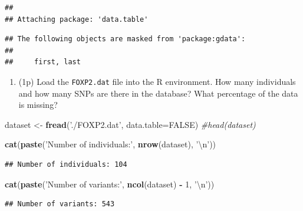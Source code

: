 \documentclass[
]{article}
\newenvironment{Shaded}{\begin{snugshade}}{\end{snugshade}}
\newcommand{\CharTok}[1]{\textcolor[rgb]{0.31,0.60,0.02}{#1}}
\newcommand{\CommentTok}[1]{\textcolor[rgb]{0.56,0.35,0.01}{\textit{#1}}}
\newcommand{\DataTypeTok}[1]{\textcolor[rgb]{0.13,0.29,0.53}{#1}}
\newcommand{\DecValTok}[1]{\textcolor[rgb]{0.00,0.00,0.81}{#1}}
\newcommand{\KeywordTok}[1]{\textcolor[rgb]{0.13,0.29,0.53}{\textbf{#1}}}
\newcommand{\NormalTok}[1]{#1}
\newcommand{\OperatorTok}[1]{\textcolor[rgb]{0.81,0.36,0.00}{\textbf{#1}}}
\newcommand{\OtherTok}[1]{\textcolor[rgb]{0.56,0.35,0.01}{#1}}
\newcommand{\StringTok}[1]{\textcolor[rgb]{0.31,0.60,0.02}{#1}}
\providecommand{\tightlist}{%
  \setlength{\itemsep}{0pt}\setlength{\parskip}{0pt}}
\begin{document}
\begin{verbatim}
## 
## Attaching package: 'data.table'
\end{verbatim}

\begin{verbatim}
## The following objects are masked from 'package:gdata':
## 
##     first, last
\end{verbatim}

\begin{enumerate}
\def\labelenumi{\arabic{enumi}.}
\setcounter{enumi}{1}
\tightlist
\item
  (1p) Load the \texttt{FOXP2.dat} file into the R environment. How many
  individuals and how many SNPs are there in the database? What
  percentage of the data is missing?
\end{enumerate}

\begin{Shaded}
\begin{Highlighting}[]
\NormalTok{dataset <-}\StringTok{ }\KeywordTok{fread}\NormalTok{(}\StringTok{'./FOXP2.dat'}\NormalTok{, }\DataTypeTok{data.table=}\OtherTok{FALSE}\NormalTok{)}
\CommentTok{#head(dataset)}

\KeywordTok{cat}\NormalTok{(}\KeywordTok{paste}\NormalTok{(}\StringTok{'Number of individuals:'}\NormalTok{, }\KeywordTok{nrow}\NormalTok{(dataset), }\StringTok{'}\CharTok{\textbackslash{}n}\StringTok{'}\NormalTok{))}
\end{Highlighting}
\end{Shaded}

\begin{verbatim}
## Number of individuals: 104
\end{verbatim}

\begin{Shaded}
\begin{Highlighting}[]
\KeywordTok{cat}\NormalTok{(}\KeywordTok{paste}\NormalTok{(}\StringTok{'Number of variants:'}\NormalTok{, }\KeywordTok{ncol}\NormalTok{(dataset) }\OperatorTok{-}\StringTok{ }\DecValTok{1}\NormalTok{, }\StringTok{'}\CharTok{\textbackslash{}n}\StringTok{'}\NormalTok{))}
\end{Highlighting}
\end{Shaded}

\begin{verbatim}
## Number of variants: 543
\end{verbatim}
\end{document}
